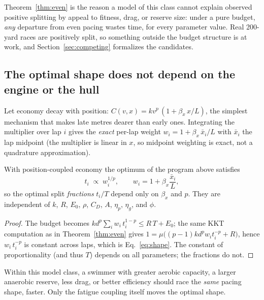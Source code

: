 Theorem~\ref{thm:even} is the reason a model of this class cannot explain
observed positive splitting by appeal to fitness, drag, or reserve size:
under a pure budget, \emph{any} departure from even pacing wastes time, for
every parameter value. Real 200-yard races are positively split, so something
outside the budget structure is at work, and Section~\ref{sec:competing}
formalizes the candidates.

\subsection{The optimal shape does not depend on the engine or the hull}

Let economy decay with position: $C(v, x) = k v^p \,(1 + \beta_x\, x/L)$,
the simplest mechanism that makes late metres dearer than early ones.
Integrating the multiplier over lap $i$ gives the \emph{exact} per-lap weight
$w_i = 1 + \beta_x\, \bar{x}_i / L$ with $\bar x_i$ the lap midpoint (the
multiplier is linear in $x$, so midpoint weighting is exact, not a
quadrature approximation).

\begin{theorem}\label{thm:shape}
With position-coupled economy the optimum of the program above satisfies
\begin{equation}
  t_i \;\propto\; w_i^{1/p},
  \qquad w_i = 1 + \beta_x \frac{\bar x_i}{L},
  \label{eq:shape}
\end{equation}
so the optimal split \emph{fractions} $t_i / T$ depend only on $\beta_x$ and
$p$. They are independent of $k$, $R$, $E_0$, $\rho$, $C_D$, $A$, $\eta_p$,
$\eta_g$, and $\phi$.
\end{theorem}

\begin{proof}
The budget becomes $k d^p \sum_i w_i\, t_i^{1-p} \le R\,T + E_0$; the same
KKT computation as in Theorem~\ref{thm:even} gives
$1 = \mu\big((p-1) k d^p w_i t_i^{-p} + R\big)$, hence
$w_i\, t_i^{-p}$ is constant across laps, which is Eq.~\eqref{eq:shape}.
The constant of proportionality (and thus $T$) depends on all parameters;
the fractions do not.
\end{proof}

\begin{corollary}\label{cor:engine}
Within this model class, a swimmer with greater aerobic capacity, a larger
anaerobic reserve, less drag, or better efficiency should race the
\emph{same} pacing shape, faster. Only the fatigue coupling itself moves the
optimal shape.
\end{corollary}

